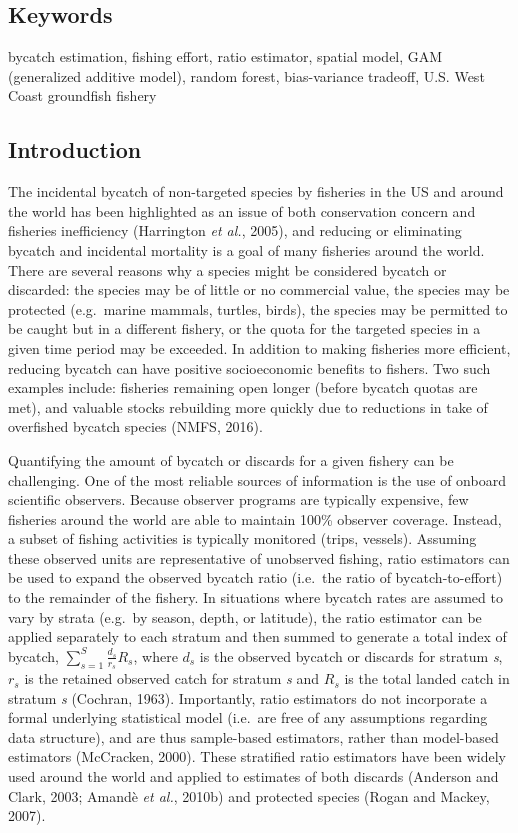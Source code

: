 \documentclass[]{article}
\begin{document}
\subsection{Keywords}\label{keywords}

bycatch estimation, fishing effort, ratio estimator, spatial model, GAM
(generalized additive model), random forest, bias-variance tradeoff,
U.S. West Coast groundfish fishery

\subsection{Introduction}\label{introduction}

The incidental bycatch of non-targeted species by fisheries in the US
and around the world has been highlighted as an issue of both
conservation concern and fisheries inefficiency (Harrington \emph{et
al.}, 2005), and reducing or eliminating bycatch and incidental
mortality is a goal of many fisheries around the world. There are
several reasons why a species might be considered bycatch or discarded:
the species may be of little or no commercial value, the species may be
protected (e.g.~marine mammals, turtles, birds), the species may be
permitted to be caught but in a different fishery, or the quota for the
targeted species in a given time period may be exceeded. In addition to
making fisheries more efficient, reducing bycatch can have positive
socioeconomic benefits to fishers. Two such examples include: fisheries
remaining open longer (before bycatch quotas are met), and valuable
stocks rebuilding more quickly due to reductions in take of overfished
bycatch species (NMFS, 2016).

Quantifying the amount of bycatch or discards for a given fishery can be
challenging. One of the most reliable sources of information is the use
of onboard scientific observers. Because observer programs are typically
expensive, few fisheries around the world are able to maintain 100\%
observer coverage. Instead, a subset of fishing activities is typically
monitored (trips, vessels). Assuming these observed units are
representative of unobserved fishing, ratio estimators can be used to
expand the observed bycatch ratio (i.e.~the ratio of bycatch-to-effort)
to the remainder of the fishery. In situations where bycatch rates are
assumed to vary by strata (e.g.~by season, depth, or latitude), the
ratio estimator can be applied separately to each stratum and then
summed to generate a total index of bycatch,
\(\sum_{ s=1 }^{ S }{ \frac { { d }_{ s } }{ { r }_{ s } } } { R }_{ s }\),
where \({ d }_{ s }\) is the observed bycatch or discards for stratum
\emph{s}, \({ r }_{ s }\) is the retained observed catch for stratum
\emph{s} and \({ R }_{ s }\) is the total landed catch in stratum
\emph{s} (Cochran, 1963). Importantly, ratio estimators do not
incorporate a formal underlying statistical model (i.e.~are free of any
assumptions regarding data structure), and are thus sample-based
estimators, rather than model-based estimators (McCracken, 2000). These
stratified ratio estimators have been widely used around the world and
applied to estimates of both discards (Anderson and Clark, 2003; Amandè
\emph{et al.}, 2010b) and protected species (Rogan and Mackey, 2007).
\end{document}
